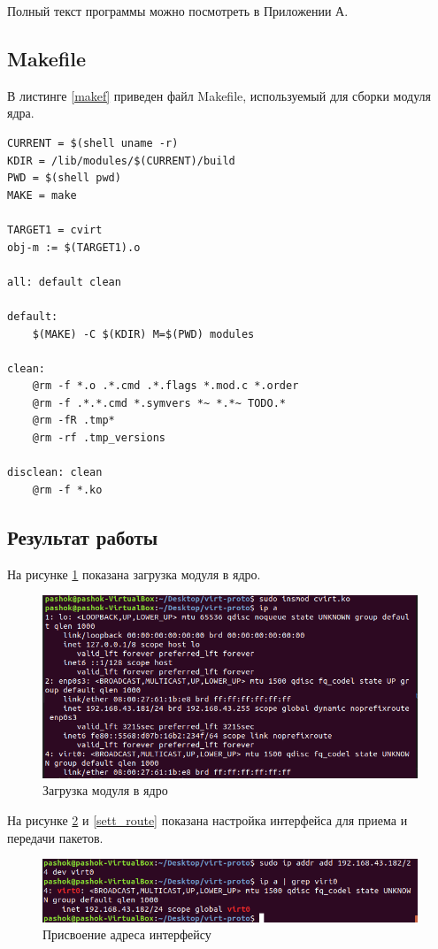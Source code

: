 \documentclass[14pt, a4paper]{extarticle}
\begin{document}
Полный текст программы можно посмотреть в Приложении А.
\subsection{Makefile}
В листинге \ref{makef} приведен файл Makefile, используемый для сборки модуля ядра.
\begin{lstlisting}[caption=Makefile, label=makef]
CURRENT = $(shell uname -r)
KDIR = /lib/modules/$(CURRENT)/build
PWD = $(shell pwd)
MAKE = make

TARGET1 = cvirt
obj-m := $(TARGET1).o

all: default clean

default:
	$(MAKE) -C $(KDIR) M=$(PWD) modules 

clean:
	@rm -f *.o .*.cmd .*.flags *.mod.c *.order
	@rm -f .*.*.cmd *.symvers *~ *.*~ TODO.*
	@rm -fR .tmp*
	@rm -rf .tmp_versions

disclean: clean
	@rm -f *.ko
\end{lstlisting}
\subsection{Результат работы}
На рисунке \ref{load} показана загрузка модуля в ядро.

\begin{figure}[H]
	\centering
	\includegraphics[scale=0.8]{load.png}
	\caption{Загрузка модуля в ядро}
	\label{load}
\end{figure}

На рисунке \ref{sett} и \ref{sett_route} показана настройка интерфейса для приема и передачи пакетов.

\begin{figure}[H]
	\centering
	\includegraphics[scale=0.8]{sett.png}
	\caption{Присвоение адреса интерфейсу}
	\label{sett}
\end{figure}
\end{document}
